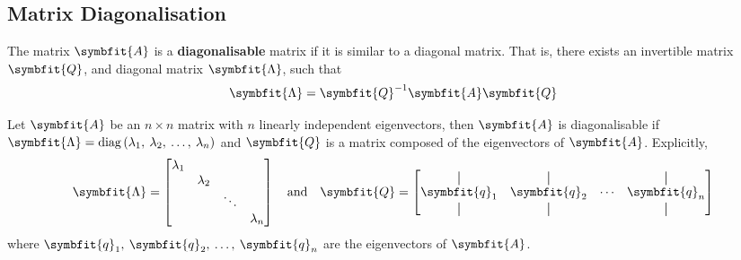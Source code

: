 \documentclass{article}
\begin{document}
\subsection{Matrix Diagonalisation}
\begin{definition}
    The matrix \(\symbfit{A}\) is a \textbf{diagonalisable} matrix if it
    is similar to a diagonal matrix. That is, there exists an invertible
    matrix \(\symbfit{Q}\), and diagonal matrix \(\symbfit{\Lambda}\),
    such that
    \begin{equation*}
        \symbfit{\Lambda}=\symbfit{Q}^{-1}\symbfit{A}\symbfit{Q}
    \end{equation*}
\end{definition}
\begin{theorem}
    Let \(\symbfit{A}\) be an \(n \times n\) matrix with \(n\) linearly
    independent eigenvectors, then \(\symbfit{A}\) is diagonalisable if
    \(\symbfit{\Lambda}=\diag{\left( \lambda_1,\: \lambda_2,\: \dots,\: \lambda_n \right)}\)
    and \(\symbfit{Q}\) is a matrix composed of the eigenvectors of
    \(\symbfit{A}\). Explicitly,
    \begin{equation*}
        \symbfit{\Lambda} =
        \begin{bmatrix}
            \lambda_1 &           &        &           \\
                      & \lambda_2 &        &           \\
                      &           & \ddots &           \\
                      &           &        & \lambda_n
        \end{bmatrix}
        \quad
        \text{and}\quad
        \symbfit{Q} =
        \begin{bmatrix}
            \vertbar      & \vertbar      &        & \vertbar      \\
            \symbfit{q}_1 & \symbfit{q}_2 & \cdots & \symbfit{q}_n \\
            \vertbar      & \vertbar      &        & \vertbar
        \end{bmatrix}
    \end{equation*}
    where \(\symbfit{q}_1,\: \symbfit{q}_2,\: \dots,\: \symbfit{q}_n\)
    are the eigenvectors of \(\symbfit{A}\).
\end{theorem}
\end{document}
